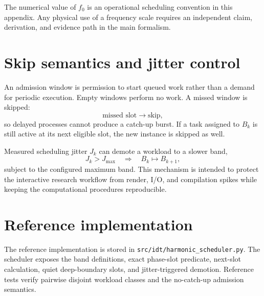 \documentclass[11pt]{book}
\begin{document}
The numerical value of $f_0$ is an operational scheduling convention in this appendix. Any physical use of a frequency scale requires an independent claim, derivation, and evidence path in the main formalism.

\section{Skip semantics and jitter control}

An admission window is permission to start queued work rather than a demand for periodic execution. Empty windows perform no work. A missed window is skipped:
\[
\text{missed slot}\longrightarrow\text{skip},
\]
so delayed processes cannot produce a catch-up burst. If a task assigned to $B_k$ is still active at its next eligible slot, the new instance is skipped as well.

Measured scheduling jitter $J_k$ can demote a workload to a slower band,
\[
J_k>J_{\max}
\quad\Longrightarrow\quad
B_k\mapsto B_{k+1},
\]
subject to the configured maximum band. This mechanism is intended to protect the interactive research workflow from render, I/O, and compilation spikes while keeping the computational procedures reproducible.

\section{Reference implementation}

The reference implementation is stored in \texttt{src/idt/harmonic\_scheduler.py}. The scheduler exposes the band definitions, exact phase-slot predicate, next-slot calculation, quiet deep-boundary slots, and jitter-triggered demotion. Reference tests verify pairwise disjoint workload classes and the no-catch-up admission semantics.
\end{document}
